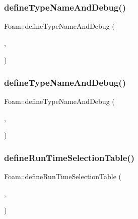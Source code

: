 \mbox{\label{namespaceFoam_afd86aa52864bbcd6cc71e1f15c4f3be3}} 
\subsubsection{\texorpdfstring{define\+Type\+Name\+And\+Debug()}{defineTypeNameAndDebug()}\hspace{0.1cm}{\footnotesize\ttfamily [23/50]}}
{\footnotesize\ttfamily Foam\+::define\+Type\+Name\+And\+Debug (\begin{DoxyParamCaption}\item[{\hyperlink{classFoam_1_1twoPhaseDragFactor}{two\+Phase\+Drag\+Factor}}]{,  }\item[{0}]{ }\end{DoxyParamCaption})}

\mbox{\label{namespaceFoam_acdfc0832896cb04db1cbd7d9d1c92523}} 
\subsubsection{\texorpdfstring{define\+Type\+Name\+And\+Debug()}{defineTypeNameAndDebug()}\hspace{0.1cm}{\footnotesize\ttfamily [24/50]}}
{\footnotesize\ttfamily Foam\+::define\+Type\+Name\+And\+Debug (\begin{DoxyParamCaption}\item[{\hyperlink{classFoam_1_1twoPhaseDragMultiplierModel}{two\+Phase\+Drag\+Multiplier\+Model}}]{,  }\item[{0}]{ }\end{DoxyParamCaption})}

\mbox{\label{namespaceFoam_a70a45ab3aa7a41db4a6d95d5d62d48f2}} 
\subsubsection{\texorpdfstring{define\+Run\+Time\+Selection\+Table()}{defineRunTimeSelectionTable()}\hspace{0.1cm}{\footnotesize\ttfamily [11/28]}}
{\footnotesize\ttfamily Foam\+::define\+Run\+Time\+Selection\+Table (\begin{DoxyParamCaption}\item[{\hyperlink{classFoam_1_1twoPhaseDragMultiplierModel}{two\+Phase\+Drag\+Multiplier\+Model}}]{,  }\item[{two\+Phase\+Drag\+Multiplier\+Models}]{ }\end{DoxyParamCaption})}

